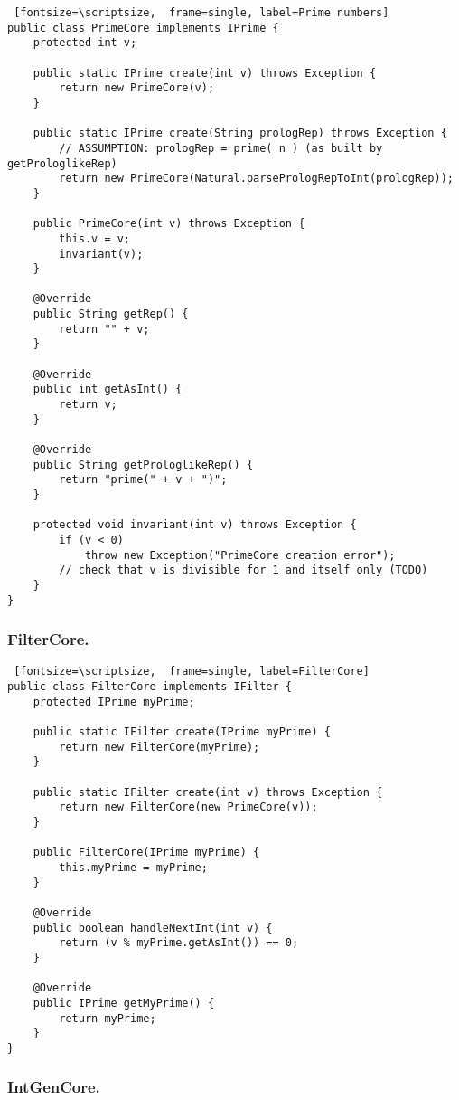 \documentclass{../llncs}
\begin{document}
\begin{Verbatim} [fontsize=\scriptsize,  frame=single, label=Prime numbers]
public class PrimeCore implements IPrime {
	protected int v;

	public static IPrime create(int v) throws Exception {
		return new PrimeCore(v);
	}

	public static IPrime create(String prologRep) throws Exception {
		// ASSUMPTION: prologRep = prime( n ) (as built by getProloglikeRep)
		return new PrimeCore(Natural.parsePrologRepToInt(prologRep));
	}

	public PrimeCore(int v) throws Exception {
		this.v = v;
		invariant(v);
	}

	@Override
	public String getRep() {
		return "" + v;
	}

	@Override
	public int getAsInt() {
		return v;
	}

	@Override
	public String getProloglikeRep() {
		return "prime(" + v + ")";
	}

	protected void invariant(int v) throws Exception {
		if (v < 0)
			throw new Exception("PrimeCore creation error");
		// check that v is divisible for 1 and itself only (TODO)
	}
}
\end{Verbatim} 
 
\subsubsection{FilterCore.\\}

\begin{Verbatim} [fontsize=\scriptsize,  frame=single, label=FilterCore]
public class FilterCore implements IFilter {
	protected IPrime myPrime;

	public static IFilter create(IPrime myPrime) {
		return new FilterCore(myPrime);
	}

	public static IFilter create(int v) throws Exception {
		return new FilterCore(new PrimeCore(v));
	}

	public FilterCore(IPrime myPrime) {
		this.myPrime = myPrime;
	}

	@Override
	public boolean handleNextInt(int v) {
		return (v % myPrime.getAsInt()) == 0;
	}

	@Override
	public IPrime getMyPrime() {
		return myPrime;
	}
}
\end{Verbatim} 

\subsubsection{IntGenCore.\\}
\end{document}
